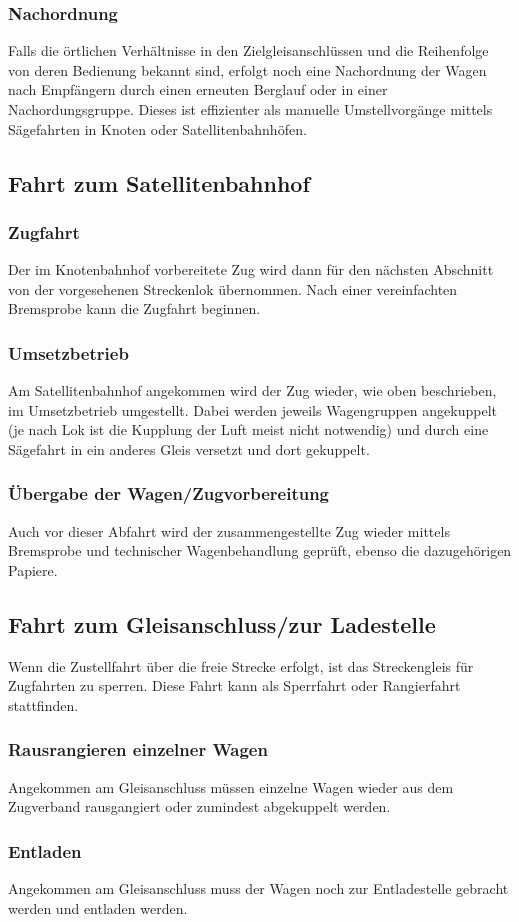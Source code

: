 \subsubsection{Nachordnung}\label{sec:Nachordnung}
Falls die örtlichen Verhältnisse in den Zielgleisanschlüssen und die Reihenfolge von deren Bedienung bekannt sind, erfolgt noch eine Nachordnung der Wagen nach Empfängern durch einen erneuten Berglauf oder in einer Nachordungsgruppe. Dieses ist effizienter als manuelle Umstellvorgänge mittels Sägefahrten in Knoten oder Satellitenbahnhöfen.

\subsection{Fahrt zum Satellitenbahnhof}
\subsubsection{Zugfahrt}\label{sec:Zugfahrt2}
Der im Knotenbahnhof vorbereitete Zug wird dann für den nächsten Abschnitt von der vorgesehenen Streckenlok übernommen. Nach einer vereinfachten \gls{Bremsprobe} kann die \gls{Zugfahrt} beginnen.\par
\subsubsection{Umsetzbetrieb}\label{sec:Umsetzbetrieb}
Am Satellitenbahnhof angekommen wird der Zug wieder, wie oben beschrieben, im Umsetzbetrieb umgestellt. Dabei werden
jeweils Wagengruppen angekuppelt (je nach Lok ist die Kupplung der Luft meist nicht notwendig) und durch eine Sägefahrt in ein anderes Gleis versetzt und dort gekuppelt.
\subsubsection{Übergabe der Wagen/Zugvorbereitung}
Auch  vor  dieser  Abfahrt  wird der  zusammengestellte  Zug wieder mittels \gls{Bremsprobe} und technischer Wagenbehandlung geprüft, ebenso die dazugehörigen Papiere.

\subsection{Fahrt zum Gleisanschluss/zur Ladestelle}\label{sec:FahrtGA}
Wenn die Zustellfahrt über die freie Strecke erfolgt, ist das Streckengleis für Zugfahrten zu sperren. Diese Fahrt kann als Sperrfahrt oder Rangierfahrt stattfinden.
\subsubsection{Rausrangieren einzelner Wagen}\label{sec:RausrangWagen}
Angekommen am \gls{Gleisanschluss} müssen einzelne Wagen wieder aus dem Zugverband rausgangiert oder zumindest abgekuppelt werden.
\subsubsection{Entladen}
Angekommen am \gls{Gleisanschluss} muss der Wagen noch zur Entladestelle gebracht werden und entladen werden.